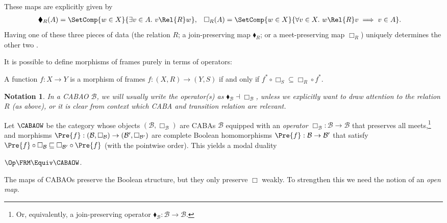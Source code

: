 \documentclass[a4paper,UKenglish,cleveref, autoref]{lipics-v2021}
\newtheorem*{notation}{Notation}
\begin{document}
These maps are explicitly given by
\begin{align*}
  \blacklozenge_R(A) &= \SetComp{w \in X}{\exists v \in A.\ v \Rel{R} w}, 
                     &
  \Box_R(A) &= \SetComp{w \in X}{\forall v \in X.\ w \Rel{R} v \implies v \in A}.
\end{align*}
Having one of these three pieces of data (the relation $R$; a
join-preserving map $\blacklozenge_R$; or a meet-preserving map
$\Box_R$) uniquely determines the other two \cite{kavvos_2024a}.

It is possible to define morphisms of frames purely in terms of operators:
\begin{lemma}
  \label{lemma:frm-morphism-box}
  A function $f : X \to Y$ is a morphism of frames \(f : (X, R) \to (Y, S)\) if
  and only if \(f^* \circ \Box_S \subseteq \Box_R \circ f^*\).
\end{lemma}

\begin{notation}
  In a CABAO \(\mathcal{B}\), we will usually write the operator(s) as
  \(\blacklozenge_{\mathcal{B}} \dashv \Box_{\mathcal{B}}\), unless we
  explicitly want to draw attention to the relation \(R\) (as above),
  or it is clear from context which CABA and transition relation are
  relevant.
\end{notation}

Let $\CABAOW$ be the category whose objects
$(\mathcal{B}, \Box_\mathcal{B})$ are CABAs $\mathcal{B}$ equipped
with an \emph{operator}
$\Box_{\mathcal{B}} : \mathcal{B} \to \mathcal{B}$ that preserves all
meets,\footnote{Or, equivalently, a join-preserving operator
  $\blacklozenge_{\mathcal{B}} : \mathcal{B} \to \mathcal{B}$.} and
morphisms
$\Pre{f} : (\mathcal{B}, \Box_\mathcal{B}) \to (\mathcal{B}',
\Box_{\mathcal{B}'})$ are complete Boolean homomorphisms
$\Pre{f} : \mathcal{B} \to \mathcal{B}'$ that satisfy
$\Pre{f} \circ \Box_\mathcal{B} \sqsubseteq \Box_{\mathcal{B}'} \circ
\Pre{f}$ (with the pointwise order). This yields a modal duality

\begin{theorem}
  \label{theorem:thomason}
  \(\Op\FRM \Equiv \CABAOW\).
\end{theorem}

The maps of CABAOs preserve the Boolean structure, but they only preserve
$\Box$ weakly. To strengthen this we need the notion of an \emph{open
map}.
\end{document}
